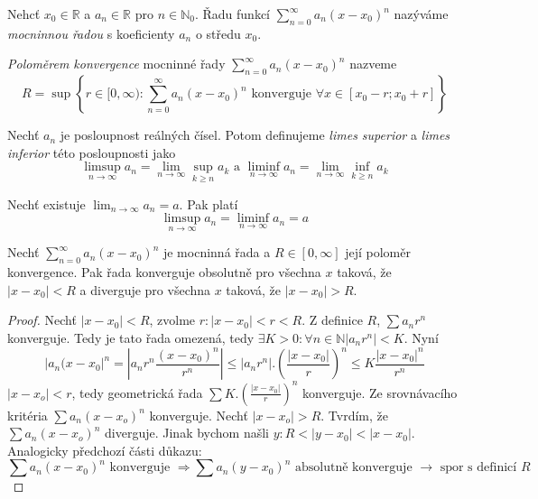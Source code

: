\begin{definice}
Nehcť $x_0 \in \mathbb{R}$ a $a_n \in \mathbb{R}$ pro $n \in \mathbb{N}_0$. Řadu funkcí $\sum_{n=0}^{\infty} a_n (x-x_0)^n$ nazýváme \emph{mocninnou řadou} s koeficienty $a_n$ o středu $x_0$.
\end{definice}

\begin{definice}
\emph{Poloměrem konvergence} mocninné řady $\sum_{n=0}^{\infty} a_n (x-x_0)^n$ nazveme $$R = \sup \left\{ r \in [ 0,\infty ) : \sum_{n=0}^{\infty}  a_n ( x - x_0 )^n \textrm{ konverguje } \forall x \in [ x_0 - r; x_0 + r ] \right\}$$
\end{definice}

\begin{definice}
Nechť $a_n$ je posloupnost reálných čísel. Potom definujeme \emph{limes superior} a \emph{limes inferior} této posloupnosti jako
$$\limsup_{n \to \infty} a_n = \lim_{n \to \infty} \sup_{k \geq n} a_k \textrm{ a } \liminf_{n \to \infty} a_n = \lim_{n \to \infty} \inf_{k \geq n} a_k$$
\end{definice}

\begin{poznamka}
Nechť existuje $\lim_{n \to \infty} a_n = a$. Pak platí
$$\limsup_{n \to \infty} a_n = \liminf_{n \to \infty} a_n = a$$
\end{poznamka}

\begin{vetal}
Nechť $\sum_{n=0}^{\infty} a_n (x-x_0)^n$ je mocninná řada a $R \in [ 0, \infty ]$ její poloměr konvergence. Pak řada konverguje obsolutně pro všechna $x$ taková, že $| x - x_0| < R$ a diverguje pro všechna $x$ taková, že $| x - x_0 | > R$.
\end{vetal}

\begin{proof}
Nechť $|x-x_0|<R$, zvolme $r: |x-x_0|<r<R$. Z definice $R$, $\sum a_nr^n$ konverguje. Tedy je tato řada omezená, tedy $\exists K>0:\forall n \in \mathbb{N} |a_nr^n|<K$.
Nyní
$$|a_n(x-x_0|^n = |a_n r^n \frac{(x-x_0)^n}{r^n}| \leq |a_nr^n|. \left( \frac{|x-x_0|}{r} \right)^n \leq K \frac{|x-x_0|^n}{r^n} $$
$|x-x_o|<r$, tedy geometrická řada $\sum K. \left( \frac{|x-x_0|}{r} \right)^n$ konverguje. Ze srovnávacího kritéria $\sum a_n(x-x_o)^n$ konverguje.
Nechť $|x-x_o|>R$. Tvrdím, že $\sum a_n(x-x_o)^n$ diverguje. Jinak bychom našli $y: R< |y-x_0| < |x-x_0|$. Analogicky předchozí části důkazu:
$$\sum a_n(x-x_0)^n \textrm{ konverguje } \Rightarrow \sum a_n(y-x_0)^n \textrm{ absolutně konverguje } \rightarrow \textrm{ spor s definicí } R$$
\end{proof}

